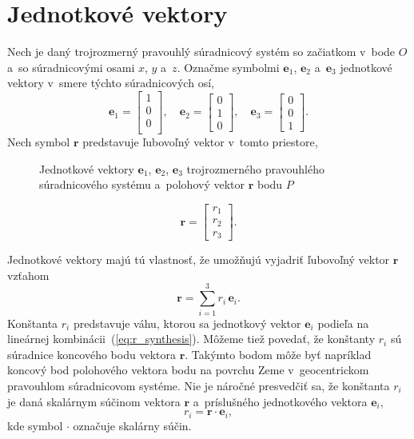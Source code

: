 \documentclass[a4paper, 12pt]{book}
\let\vec\mathbf
\begin{document}
\section{Jednotkové vektory}
\label{sec:unit_vectors}

Nech je daný trojrozmerný pravouhlý súradnicový systém so začiatkom v~bode $O$
a~so súradnicovými osami $x$, $y$ a~$z$.  Označme symbolmi $\vec e_1$, $\vec
e_2$ a~$\vec e_3$ jednotkové vektory v~smere týchto súradnicových osí,
%
\begin{equation}
\vec e_1 =
\begin{bmatrix}
1\\
0\\
0\\
\end{bmatrix}
{,} \quad
%
\vec e_2 =
\begin{bmatrix}
0\\
1\\
0
\end{bmatrix}
%
{,}\quad
%
\vec e_3 =
\begin{bmatrix}
0\\
0\\
1
\end{bmatrix}
{.}
\end{equation}
%
Nech symbol $\vec r$ predstavuje ľubovoľný vektor v~tomto priestore,

\begin{figure}
\centering

\caption{Jednotkové vektory $\vec e_1$, $\vec e_2$, $\vec e_3$ trojrozmerného
pravouhlého súradnicového systému a~polohový vektor $\vec r$ bodu $P$}
\label{fig:unit_vectors}
\end{figure}

\begin{equation}
\vec r =
\begin{bmatrix}
r_1\\
r_2\\
r_3
\end{bmatrix}
{.}
\end{equation}

Jednotkové vektory majú tú vlastnosť, že umožňujú vyjadriť ľubovoľný vektor
$\vec r$ vzťahom
%
\begin{equation}
\label{eq:r_synthesis}
\vec r = \sum_{i = 1}^3 r_i \, \vec e_i{.}
\end{equation}
%
Konštanta $r_i$ predstavuje váhu, ktorou sa jednotkový vektor $\vec e_i$
podieľa na lineárnej kombinácii~(\ref{eq:r_synthesis}).  Môžeme tiež povedať,
že konštanty $r_i$ sú súradnice koncového bodu vektora $\vec r$.  Takýmto bodom
môže byť napríklad koncový bod polohového vektora bodu na povrchu Zeme
v~geocentrickom pravouhlom súradnicovom systéme.  Nie je náročné presvedčiť sa,
že konštanta $r_i$ je daná skalárnym súčinom vektora $\vec r$ a~príslušného
jednotkového vektora $\vec e_i$,
%
\begin{equation}
\label{eq:r_analysis}
r_i = \vec r \cdot \vec e_i{,}
\end{equation}
%
kde symbol $\cdot$ označuje skalárny súčin.
\end{document}
